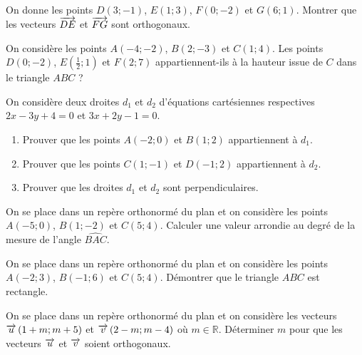 \documentclass[11pt]{article}
\begin{document}
\thispagestyle{empty}

\begin{exo}
  On donne les points $D(3; -1)$, $E(1; 3)$, $F(0; -2)$ et $G(6; 1)$. Montrer
  que les vecteurs $\overrightarrow{DE}$ et $\overrightarrow{FG}$ sont orthogonaux.
\end{exo}

\begin{exo}
  On considère les points $A(-4; -2)$, $B(2; -3)$ et $C(1; 4)$. Les points
  $D(0; -2)$, $E\left( \frac{1}{2};1 \right)$ et $F(2; 7)$ appartiennent-ils à
  la hauteur issue de $C$ dans le triangle $ABC$ ?
\end{exo}

\begin{exo}
  On considère deux droites $d_1$ et $d_2$ d'équations cartésiennes respectives
  $2x-3y+4=0$ et $3x+2y-1=0$.
  \begin{enumerate}
    \item Prouver que les points $A(-2; 0)$ et $B(1; 2)$ appartiennent à $d_1$.
    \item Prouver que les points $C(1; -1)$ et $D(-1; 2)$ appartiennent à $d_2$.
    \item Prouver que les droites $d_1$ et $d_2$ sont perpendiculaires.
  \end{enumerate}
\end{exo}

\begin{exo}
  On se place dans un repère orthonormé du plan et on considère les points
  $A(-5; 0)$, $B(1; -2)$ et $C(5; 4)$. Calculer une valeur arrondie au degré de
  la mesure de l'angle $\widehat{BAC}$.
\end{exo}

\begin{exo}
  On se place dans un repère orthonormé du plan et on considère les points
  $A(-2; 3)$, $B(-1; 6)$ et $C(5; 4)$. Démontrer que le triangle $ABC$ est
  rectangle.
\end{exo}

\begin{exo}
  On se place dans un repère orthonormé du plan et on considère les vecteurs
  $\overrightarrow{u}\left( 1+m; m+5 \right)$ et $\overrightarrow{v}\left( 2-m; m-4 \right)$ où
  $m\in\mathbb{R}$. Déterminer $m$ pour que les vecteurs $\overrightarrow{u}$ et $\overrightarrow{v}$
  soient orthogonaux.
\end{exo}
\end{document}
